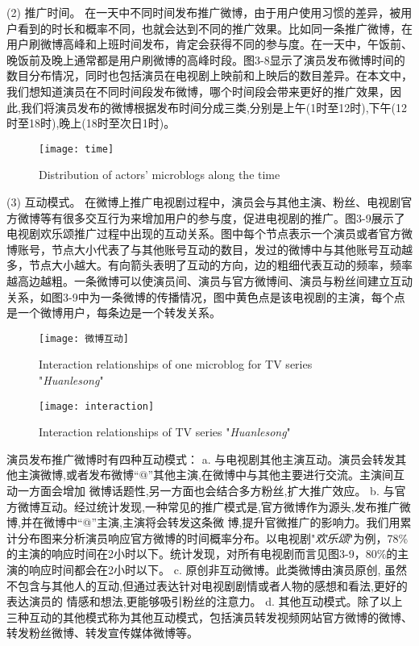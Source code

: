 (2) 推广时间。
在一天中不同时间发布推广微博，由于用户使用习惯的差异，被用户看到的时长和概率不同，也就会达到不同的推广效果。比如同一条推广微博，在用户刷微博高峰和上班时间发布，肯定会获得不同的参与度。在一天中，午饭前、晚饭前及晚上通常都是用户刷微博的高峰时段。图3-8显示了演员发布微博时间的数目分布情况，同时也包括演员在电视剧上映前和上映后的数目差异。在本文中，我们想知道演员在不同时间段发布微博，哪个时间段会带来更好的推广效果，因此,我们将演员发布的微博根据发布时间分成三类,分别是上午(1时至12时),下午(12时至18时),晚上(18时至次日1时)。
\begin{figure}[!htbp]
\centering
\texttt{[image: time]}
\caption{Distribution of actors' microblogs along the time}
\end{figure}

(3) 互动模式。
在微博上推广电视剧过程中，演员会与其他主演、粉丝、电视剧官方微博等有很多交互行为来增加用户的参与度，促进电视剧的推广。图3-9展示了电视剧欢乐颂推广过程中出现的互动关系。图中每个节点表示一个演员或者官方微博账号，节点大小代表了与其他账号互动的数目，发过的微博中与其他账号互动越多，节点大小越大。有向箭头表明了互动的方向，边的粗细代表互动的频率，频率越高边越粗。一条微博可以使演员间、演员与官方微博间、演员与粉丝间建立互动关系，如图3-9中为一条微博的传播情况，图中黄色点是该电视剧的主演，每个点是一个微博用户，每条边是一个转发关系。

\begin{figure}[!htbp]
\centering
\texttt{[image: 微博互动]}
\caption{Interaction relationships of one microblog for TV series "\textit{Huanlesong}"}
\end{figure}

\begin{figure}[!htbp]
\centering
\texttt{[image: interaction]}
\caption{Interaction relationships of TV series "\textit{Huanlesong}"}
\end{figure}

演员发布推广微博时有四种互动模式：
a. 与电视剧其他主演互动。演员会转发其他主演微博,或者发布微博“@”其他主演,在微博中与其他主要进行交流。主演间互动一方面会增加 微博话题性,另一方面也会结合多方粉丝,扩大推广效应。
b. 与官方微博互动。经过统计发现,一种常见的推广模式是,官方微博作为源头,发布推广微博,并在微博中“@”主演,主演将会转发这条微 博,提升官微推广的影响力。我们用累计分布图来分析演员响应官方微博的时间概率分布。以电视剧"\textit{欢乐颂}"为例，78\%的主演的响应时间在2小时以下。统计发现，对所有电视剧而言见图3-9，80\%的主演的响应时间都会在2小时以下。
c. 原创非互动微博。此类微博由演员原创, 虽然不包含与其他人的互动,但通过表达针对电视剧剧情或者人物的感想和看法,更好的表达演员的 情感和想法,更能够吸引粉丝的注意力。
d. 其他互动模式。除了以上三种互动的其他模式称为其他互动模式，包括演员转发视频网站官方微博的微博、转发粉丝微博、转发宣传媒体微博等。

